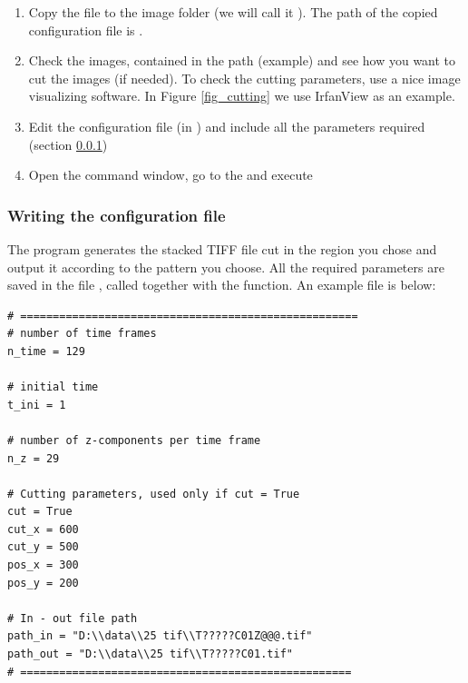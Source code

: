 \documentclass[12pt]{article}
\begin{document}
\begin{enumerate}
\item{Copy the file  to the image folder (we will call it ). The path of the copied configuration file is .}
\item{Check the images, contained in the path (example)  and see how you want to cut the images (if needed). To check the cutting parameters, use a nice image visualizing software. In Figure \ref{fig_cutting} we use IrfanView as an example.}
\item{Edit the configuration file (in ) and include all the parameters required (section \ref{sec_write_cut_config})}
\item{Open the command window, go to the  and execute }
\end{enumerate}

\subsubsection{Writing the configuration file} \label{sec_write_cut_config}

The program generates the stacked TIFF file cut in the region you chose and output it according to the pattern you choose. All the required parameters are saved in the file , called together with the function. An example file is below:

\begin{verbatim}
# ====================================================
# number of time frames
n_time = 129

# initial time
t_ini = 1

# number of z-components per time frame
n_z = 29

# Cutting parameters, used only if cut = True
cut = True
cut_x = 600 
cut_y = 500
pos_x = 300
pos_y = 200

# In - out file path
path_in = "D:\\data\\25 tif\\T?????C01Z@@@.tif"
path_out = "D:\\data\\25 tif\\T?????C01.tif"
# ===================================================
\end{verbatim}
\end{document}
